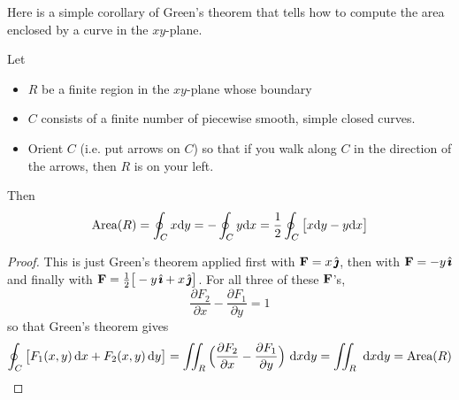 Here is a simple corollary of Green's theorem that tells how to compute the area enclosed by a curve in the $xy$-plane.
\begin{cor}\label{cor:greens}
Let 
\begin{itemize}\itemsep1pt \parskip0pt  %
\item
$R$ be a finite region in the $xy$-plane whose boundary
\item
$C$ consists of a finite number of piecewise smooth, simple closed curves.
\item
Orient $C$ (i.e. put arrows on $C$) so that if you walk along
$C$ in the direction of the arrows, then $R$ is on your left.

\end{itemize}
Then
\begin{equation*}
\text{Area}(R)
 =\oint_C x\mathrm{d}y
 =-\oint_C y\mathrm{d}x
 =\frac{1}{2}\oint_C \big[x\mathrm{d}y -y\mathrm{d}x\big]
\end{equation*}
\end{cor}
\begin{proof}
This is just Green's theorem applied first with 
$\mathbf{F} = x\,\hat{\pmb{\jmath}}$, then with $\mathbf{F}= -y\,\hat{\pmb{\imath}}$ and finally with 
$\mathbf{F} = \frac{1}{2}\big[-y\,\hat{\pmb{\imath}} +x\,\hat{\pmb{\jmath}}\big]$. For all three of these
$\mathbf{F}$'s,
\begin{equation*}
\frac{\partial F_2}{\partial x} 
                - \frac{\partial F_1}{\partial y} = 1
\end{equation*}
so that Green's theorem gives
\begin{equation*}
\oint_{C} \big[F_1(x,y)\,\mathrm{d}x +F_2(x,y)\,\mathrm{d}y\big]
 =\iint_{R}\Big(\frac{\partial F_2}{\partial x} 
                - \frac{\partial F_1}{\partial y}\Big)\ \mathrm{d}x\mathrm{d}y
 =\iint_{R}\ \mathrm{d}x\mathrm{d}y
 = \text{Area}(R)
\end{equation*}

\end{proof}


